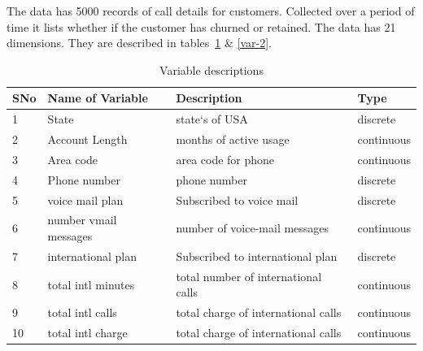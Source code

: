 The data has 5000 records of call details for customers. Collected over a period of time it lists whether if the customer has churned or retained.
The data has 21 dimensions. They are described in tables~\ref{var-1} \& \ref{var-2}.
\begin{table}[h]
	\centering
	\caption{Variable descriptions}
	\label{var-1}
	\begin{tabular}{llll}
		\hline
		SNo & Name of Variable & Description            & Type                \\
		\hline
		1 & State            & state`s of USA           & discrete            \\
		2 & Account Length   & months of active usage & continuous  \\
		3 & Area code        & area code for phone  & continuous          \\
		4 & Phone number     & phone number  & discrete           \\
		5 & voice mail plan & Subscribed to voice mail & discrete   \\
		6 & number vmail messages & number of voice-mail messages &  continuous   \\
		7 & international plan & Subscribed to international plan &  discrete   \\
		8 & total intl minutes &  total number of international calls  &  continuous   \\
		9 & total intl calls & total charge of international calls &  continuous   \\
		10 & total intl charge & total charge of international calls                       &  continuous   \\
		\hline
	\end{tabular}
\end{table}
